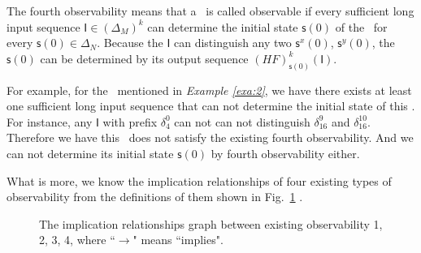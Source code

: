The fourth observability means that a \BCN\ is called observable if every sufficient long input sequence $\mathsf{I}\in(\Delta_M)^{k}$ can determine the initial state $\mathsf{s}(0)$ of the \BCN\ for every $\mathsf{s}(0)\in\Delta_N$. Because the $\mathsf{I}$ can distinguish any two $\mathsf{s}^{x}(0)$, $\mathsf{s}^{y}(0)$, the $\mathsf{s}(0)$ can be determined by its output sequence $(HF)^k_{\mathsf{s}(0)}(\mathsf{I})$.
\begin{example}
For example, for the \BCN\ mentioned in {\em Example \ref{exa:2}}, we have there exists at least one sufficient long input sequence that can not determine the initial state of this \BCN. For instance, any $\mathsf{I}$ with prefix $\delta_{4}^0$ can not can not distinguish $\delta_{16}^9$ and $\delta_{16}^{10}$. 
Therefore we have this \BCN\ does not satisfy the existing fourth observability. And we can not determine its initial state $\mathsf{s}(0)$ by fourth observability either. 
\label{exa:7}
\end{example}  

What is more, we know the implication relationships of four existing types of observability from the definitions of them shown in Fig.~\ref{fig:9} \cite{Zhang2016Observability}. 

 \begin{figure}[thpb]
      \centering
      
      \caption{The implication relationships graph between existing observability 1, 2, 3, 4, where ``$\rightarrow$" means ``implies".}
      \label{fig:9}
   \end{figure}

